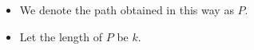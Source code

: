 \begin{itemize}
    \item We denote the path obtained in this way as $P$.
    \item Let the length of $P$ be $k$.
\end{itemize}